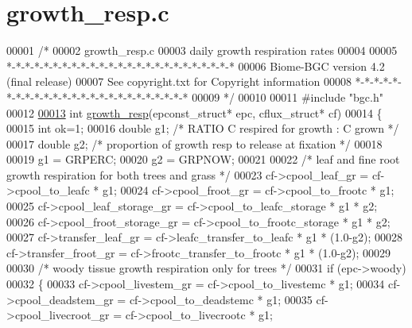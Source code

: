 \hypertarget{growth__resp_8c_source}{}\section{growth\+\_\+resp.\+c}
\label{growth__resp_8c_source}

\begin{DoxyCode}
00001 \textcolor{comment}{/* }
00002 \textcolor{comment}{growth\_resp.c}
00003 \textcolor{comment}{daily growth respiration rates}
00004 \textcolor{comment}{}
00005 \textcolor{comment}{*-*-*-*-*-*-*-*-*-*-*-*-*-*-*-*-*-*-*-*-*-*-*-*-*}
00006 \textcolor{comment}{Biome-BGC version 4.2 (final release)}
00007 \textcolor{comment}{See copyright.txt for Copyright information}
00008 \textcolor{comment}{*-*-*-*-*-*-*-*-*-*-*-*-*-*-*-*-*-*-*-*-*-*-*-*-*}
00009 \textcolor{comment}{*/}
00010 
00011 \textcolor{preprocessor}{#include "bgc.h"}
00012 
\hypertarget{growth__resp_8c_source_l00013}{}\hyperlink{growth__resp_8c_a85d965990cd0096b29def19816e47e62}{00013} \textcolor{keywordtype}{int} \hyperlink{growth__resp_8c_a85d965990cd0096b29def19816e47e62}{growth\_resp}(epconst\_struct* epc, cflux\_struct* cf)
00014 \{
00015     \textcolor{keywordtype}{int} ok=1;
00016     \textcolor{keywordtype}{double} g1;   \textcolor{comment}{/* RATIO   C respired for growth : C grown  */} 
00017     \textcolor{keywordtype}{double} g2;   \textcolor{comment}{/* proportion of growth resp to release at fixation */}
00018 
00019     g1 = GRPERC;
00020     g2 = GRPNOW;
00021     
00022     \textcolor{comment}{/* leaf and fine root growth respiration for both trees and grass */}    
00023     cf->cpool\_leaf\_gr     = cf->cpool\_to\_leafc * g1;
00024     cf->cpool\_froot\_gr    = cf->cpool\_to\_frootc * g1;
00025     cf->cpool\_leaf\_storage\_gr  = cf->cpool\_to\_leafc\_storage * g1 * g2;
00026     cf->cpool\_froot\_storage\_gr = cf->cpool\_to\_frootc\_storage * g1 * g2; 
00027     cf->transfer\_leaf\_gr  = cf->leafc\_transfer\_to\_leafc * g1 * (1.0-g2);
00028     cf->transfer\_froot\_gr = cf->frootc\_transfer\_to\_frootc * g1 * (1.0-g2);
00029     
00030     \textcolor{comment}{/* woody tissue growth respiration only for trees */}
00031     \textcolor{keywordflow}{if} (epc->woody)
00032     \{
00033         cf->cpool\_livestem\_gr     = cf->cpool\_to\_livestemc * g1;
00034         cf->cpool\_deadstem\_gr     = cf->cpool\_to\_deadstemc * g1;
00035         cf->cpool\_livecroot\_gr    = cf->cpool\_to\_livecrootc * g1;

\end{DoxyCode}
